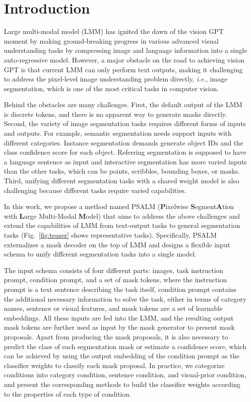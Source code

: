 \section{Introduction}
Large multi-modal model (LMM) has ignited the dawn of the vision GPT~\cite{GPT3} moment by making ground-breaking progress in various advanced visual understanding tasks by compressing image and language information into a single auto-regressive model. 
However, a major obstacle on the road to achieving vision GPT is that current LMM can only perform text outputs, making it challenging to address the pixel-level image understanding problem directly, \textit{i.e.}, image segmentation, which is one of the most critical tasks in computer vision.

Behind the obstacles are many challenges. First, the default output of the LMM is discrete tokens, and there is no apparent way to generate masks directly. Second, the variety of image segmentation tasks requires different forms of inputs and outputs. For example, semantic segmentation needs support inputs with different categories. Instance segmentation demands generate object IDs and the class confidence score for each object. Referring segmentation is supposed to have a language sentence as input and interactive segmentation has more varied inputs than the other tasks, which can be points, scribbles, bounding boxes, or masks. Third, unifying different segmentation tasks with a shared weight model is also challenging because different tasks require varied capabilities.

In this work, we propose a method named PSALM (\textbf{P}ixelwise \textbf{S}egment\textbf{A}tion with \textbf{L}arge Multi-Modal \textbf{M}odel) that aims to address the above challenges and extend the capabilities of LMM from text-output tasks to general segmentation tasks (Fig.~\ref{fig:teaser} shows representative tasks). Specifically, PSALM externalizes a mask decoder on the top of LMM and designs a flexible input schema to unify different segmentation tasks into a single model.

The input schema consists of four different parts: images, task instruction prompt, condition prompt, and a set of mask tokens, where the instruction prompt is a text sentence describing the task itself, condition prompt contains the additional necessary information to solve the task, either in terms of category names, sentence or visual features, and mask tokens are a set of learnable embeddings. All these inputs are fed into the LMM, and the resulting output mask tokens are further used as input by the mask generator to present mask proposals. 
Apart from producing the mask proposals, it is also necessary to predict the class of each segmentation mask or estimate a confidence score, which can be achieved by using the output embedding of the condition prompt as the classifier weights to classify each mask proposal. In practice, we categorize conditions into category condition, sentence condition, and visual-prior condition, and present the corresponding methods to build the classifier weights according to the properties of each type of condition. 

